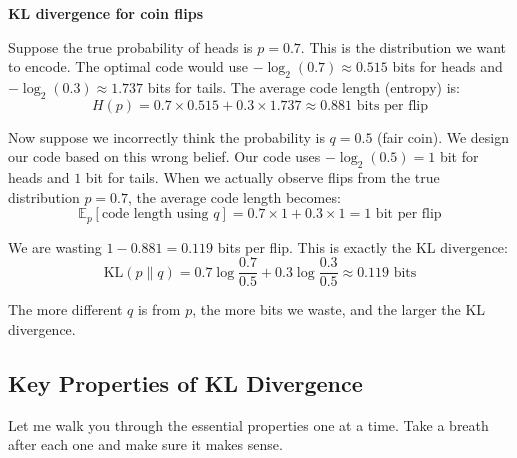 \begin{examplebox}
\textbf{KL divergence for coin flips}

\vspace{0.5em}

Suppose the true probability of heads is $p = 0.7$. This is the distribution we want to encode. The optimal code would use $-\log_2(0.7) \approx 0.515$ bits for heads and $-\log_2(0.3) \approx 1.737$ bits for tails. The average code length (entropy) is:
\begin{equation*}
H(p) = 0.7 \times 0.515 + 0.3 \times 1.737 \approx 0.881 \text{ bits per flip}
\end{equation*}

\vspace{0.5em}

Now suppose we incorrectly think the probability is $q = 0.5$ (fair coin). We design our code based on this wrong belief. Our code uses $-\log_2(0.5) = 1$ bit for heads and $1$ bit for tails. When we actually observe flips from the true distribution $p = 0.7$, the average code length becomes:
\begin{equation*}
\mathbb{E}_{p}[\text{code length using } q] = 0.7 \times 1 + 0.3 \times 1 = 1 \text{ bit per flip}
\end{equation*}

\vspace{0.5em}

We are wasting $1 - 0.881 = 0.119$ bits per flip. This is exactly the KL divergence:
\begin{equation*}
\text{KL}(p \| q) = 0.7 \log \frac{0.7}{0.5} + 0.3 \log \frac{0.3}{0.5} \approx 0.119 \text{ bits}
\end{equation*}

\vspace{0.5em}

The more different $q$ is from $p$, the more bits we waste, and the larger the KL divergence.
\end{examplebox}

\vspace{1.5em}

\subsection{Key Properties of KL Divergence}

Let me walk you through the essential properties one at a time. Take a breath after each one and make sure it makes sense.

\vspace{1em}

